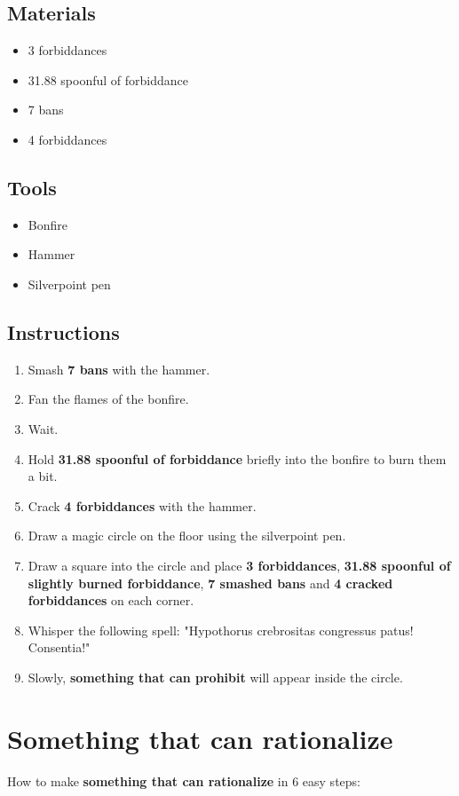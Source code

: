 \documentclass{article}
\begin{document}
\subsection{Materials}\begin{itemize}
\item 
3 forbiddances
\item 
31.88 spoonful of forbiddance
\item 
7 bans
\item 
4 forbiddances
\end{itemize}
\subsection{Tools}\begin{itemize}
\item 
Bonfire
\item 
Hammer
\item 
Silverpoint pen
\end{itemize}
\subsection{Instructions}\begin{enumerate}
\item 
Smash \textbf{7 bans} with the hammer.
\item 
Fan the flames of the bonfire.
\item 
Wait.
\item 
Hold \textbf{31.88 spoonful of forbiddance} briefly into the bonfire to burn them a bit.
\item 
Crack \textbf{4 forbiddances} with the hammer.
\item 
Draw a magic circle on the floor using the silverpoint pen.
\item 
Draw a square into the circle and place \textbf{3 forbiddances}, \textbf{31.88 spoonful of slightly burned forbiddance}, \textbf{7 smashed bans} and \textbf{4 cracked forbiddances} on each corner.
\item 
Whisper the following spell: "Hypothorus crebrositas congressus patus! Consentia!"
\item 
Slowly, \textbf{something that can prohibit} will appear inside the circle.
\end{enumerate}
\newpage
\section{Something that can rationalize}How to make \textbf{something that can rationalize} in 6 easy steps:
\end{document}
